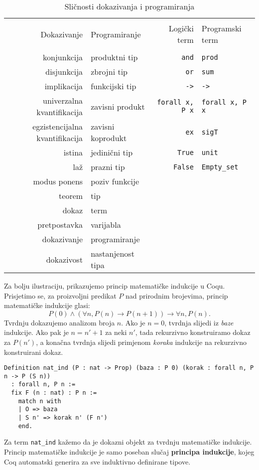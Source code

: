 \begin{table}[!hbt]
  \centering
  \begin{tabular}[!htb]{rlrl}
    \toprule \\
    Dokazivanje & Programiranje & Logički term & Programski term \\
    \midrule \\
    konjunkcija & produktni tip  & \texttt{and} & \texttt{prod} \\
    disjunkcija & zbrojni tip & \texttt{or} & \texttt{sum} \\
    implikacija & funkcijski tip & \texttt{->} & \texttt{->} \\
    univerzalna kvantifikacija & zavisni produkt & \texttt{forall x, P x} & \texttt{forall x, P x} \\
    egzistencijalna kvantifikacija & zavisni koprodukt & \texttt{ex} & \texttt{sigT} \\
    istina & jedinični tip & \texttt{True} & \texttt{unit} \\
    laž & prazni tip & \texttt{False} & \texttt{Empty\_set} \\
    modus ponens & poziv funkcije &  &  \\
    teorem & tip & & \\
    dokaz & term & & \\
    pretpostavka & varijabla & & \\
    dokazivanje & programiranje & & \\
    dokazivost & nastanjenost tipa & & \\
    \bottomrule
  \end{tabular}
  \caption{Sličnosti dokazivanja i programiranja}\label{tab:curryhoward}
\end{table}

Za bolju ilustraciju, prikazujemo princip matematičke indukcije u Coqu.
Prisjetimo se, za proizvoljni predikat \(P\) nad prirodnim brojevima, princip matematičke indukcije glasi:
\[
  P(0) \land (\forall n, P(n) \rightarrow P(n + 1)) \rightarrow \forall n, P(n).
\]
\noindent Tvrdnju dokazujemo analizom broja \(n\).
Ako je \(n = 0\), tvrdnja slijedi iz \textit{baze} indukcije.
Ako pak je \(n = n' + 1\) za neki \(n'\), tada rekurzivno konstruiramo dokaz za \(P(n')\), a konačna tvrdnja slijedi primjenom \textit{koraka} indukcije na rekurzivno konstruirani dokaz.
\begin{verbatim}
Definition nat_ind (P : nat -> Prop) (baza : P 0) (korak : forall n, P n -> P (S n))
  : forall n, P n :=
  fix F (n : nat) : P n :=
    match n with
    | O => baza
    | S n' => korak n' (F n')
    end.
\end{verbatim}
Za term \texttt{nat\_ind} kažemo da je dokazni objekt  za tvrdnju matematičke indukcije.
Princip matematičke indukcije je samo poseban slučaj \textbf{principa indukcije}, kojeg Coq automatski generira za sve induktivno definirane tipove.

